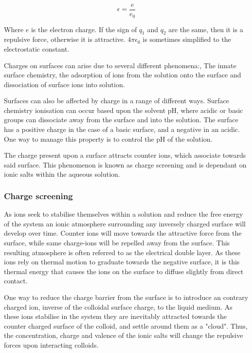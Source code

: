 \begin{equation} %
\epsilon =  \frac{e}{e_0}
\end{equation}

Where $e$ is the electron charge. If the sign of $q_1$ and $q_2$ are the same, then it is a repulsive force, otherwise it is attractive. $4\pi \epsilon_0$ is sometimes simplified to the electrostatic constant. 

Charges on surfaces can arise due to several different phenomena:, The innate surface chemistry, the adsorption of ions from the solution onto the surface and dissociation of surface ions into solution.

Surfaces can also be affected by charge in a range of different ways.  Surface chemistry ionisation can occur based upon the solvent pH, where acidic or basic groups can dissociate away from the surface and into the solution. The surface has a positive charge in the case of a basic surface, and a negative in an acidic. One way to manage this property is to control the pH of the solution. %

The charge present upon a surface attracts counter ions, which associate towards said surface. This phenomenon is known as charge screening and is dependant on ionic salts within the aqueous solution.
\cite{babthes}%

\subsubsection{Charge screening}


As ions seek to stabilise themselves within a solution and reduce the free energy of the system an ionic atmosphere surrounding any inversely charged surface will develop over time. Counter ions will move towards the attractive force from the surface, while same charge-ions will be repelled away from the surface. This resulting atmosphere is often referred to as the electrical double layer. As these ions rely on thermal motion to graduate towards the negative surface, it is this thermal energy that causes the ions on the surface to diffuse slightly from direct contact.

One way to reduce the charge barrier from the surface is to introduce an contrary charged ion, inverse of the colloidal surface charge, to the liquid medium. As these ions stabilise in the system they are inevitably attracted towards the counter charged surface of the colloid, and settle around them as a "cloud". Thus, the concentration, charge and valence of the ionic salts will change the repulsive forces upon interacting colloids.\cite{?}

